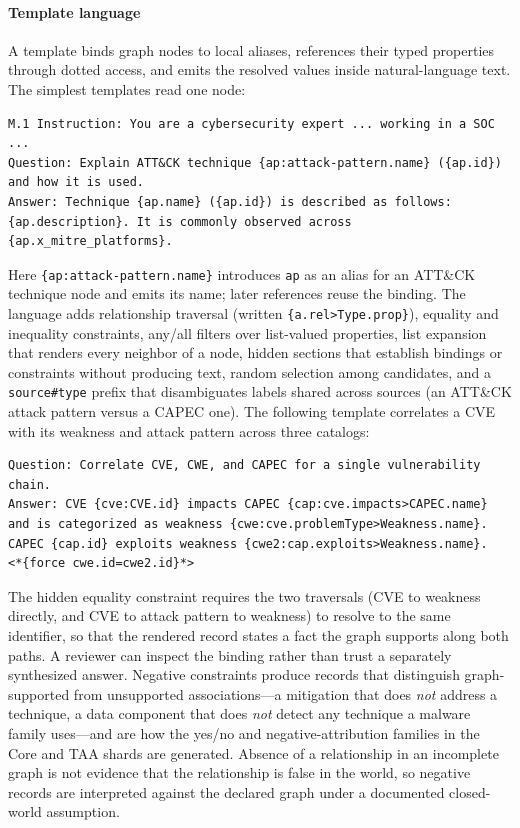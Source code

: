\documentclass[twocolumn]{svjour3}
\begin{document}
\paragraph{Template language}
A template binds graph nodes to local aliases, references their typed properties through dotted access, and emits the resolved values inside natural-language text. The simplest templates read one node:
\begin{lstlisting}
M.1 Instruction: You are a cybersecurity expert ... working in a SOC ...
Question: Explain ATT&CK technique {ap:attack-pattern.name} ({ap.id}) and how it is used.
Answer: Technique {ap.name} ({ap.id}) is described as follows: {ap.description}. It is commonly observed across {ap.x_mitre_platforms}.
\end{lstlisting}
Here \texttt{\{ap:attack-pattern.name\}} introduces \texttt{ap} as an alias for an ATT\&CK technique node and emits its name; later references reuse the binding. The language adds relationship traversal (written \texttt{\{a.rel>Type.prop\}}), equality and inequality constraints, any/all filters over list-valued properties, list expansion that renders every neighbor of a node, hidden sections that establish bindings or constraints without producing text, random selection among candidates, and a \texttt{source\#type} prefix that disambiguates labels shared across sources (an ATT\&CK attack pattern versus a CAPEC one). The following template correlates a CVE with its weakness and attack pattern across three catalogs:
\begin{lstlisting}
Question: Correlate CVE, CWE, and CAPEC for a single vulnerability chain.
Answer: CVE {cve:CVE.id} impacts CAPEC {cap:cve.impacts>CAPEC.name}
and is categorized as weakness {cwe:cve.problemType>Weakness.name}.
CAPEC {cap.id} exploits weakness {cwe2:cap.exploits>Weakness.name}.
<*{force cwe.id=cwe2.id}*>
\end{lstlisting}
The hidden equality constraint requires the two traversals (CVE to weakness directly, and CVE to attack pattern to weakness) to resolve to the same identifier, so that the rendered record states a fact the graph supports along both paths. A reviewer can inspect the binding rather than trust a separately synthesized answer. Negative constraints produce records that distinguish graph-supported from unsupported associations---a mitigation that does \emph{not} address a technique, a data component that does \emph{not} detect any technique a malware family uses---and are how the yes/no and negative-attribution families in the Core and TAA shards are generated. Absence of a relationship in an incomplete graph is not evidence that the relationship is false in the world, so negative records are interpreted against the declared graph under a documented closed-world assumption.
\end{document}
